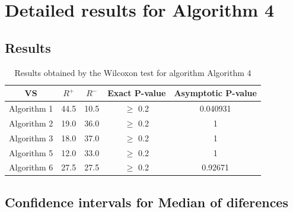 \documentclass[a4paper,10pt]{article}
\begin{document}
 \clearpage 


\section{Detailed results for Algorithm 4}


\subsection{Results}

\begin{table}[!htp]
\centering\small
\begin{tabular}{
|c|c|c|c|c|}
\hline
 VS & $R^{+}$ & $R^{-}$ & Exact P-value & Asymptotic P-value \\ \hline 
Algorithm 1 & 44.5 & 10.5 & $\geq$ 0.2 & 0.040931\\ \hline 
Algorithm 2 & 19.0 & 36.0 & $\geq$ 0.2 & 1\\ \hline 
Algorithm 3 & 18.0 & 37.0 & $\geq$ 0.2 & 1\\ \hline 
Algorithm 5 & 12.0 & 33.0 & $\geq$ 0.2 & 1\\ \hline 
Algorithm 6 & 27.5 & 27.5 & $\geq$ 0.2 & 0.92671\\ \hline 

\end{tabular}
\caption{Results obtained by the Wilcoxon test for algorithm Algorithm 4}
\end{table}

\subsection{Confidence intervals for Median of diferences}
\end{document}
